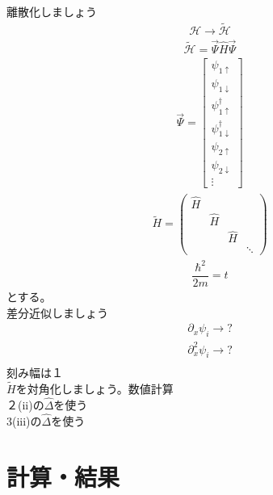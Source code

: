\documentclass{jarticle}
\begin{document}
離散化しましょう\\
\begin{align}
\mathcal{H}\rightarrow \tilde{\mathcal{H}}
\end{align}
\begin{align}
\tilde{\mathcal{H}}=\vec{\Psi}\hat{H}\vec{\Psi}		%
\end{align}
\begin{align}
\vec{\Psi}=\begin{bmatrix}
\psi_{1\uparrow} \\
\psi_{1\downarrow} \\
\psi_{1\uparrow}^\dagger \\
\psi_{1\downarrow}^\dagger\\
\psi_{2\uparrow} \\
\psi_{2\downarrow} \\
\vdots
\end{bmatrix}
\end{align}
\begin{align}
\tilde{H}=
\begin{pmatrix}
\hat{H} &  &  &  \\
& \hat{H} &  &  \\
&  & \hat{H} &  \\
&  &  & \ddots
\end{pmatrix}
\end{align}
\begin{align}
\dfrac{\hbar^2}{2m}=t
\end{align}
とする。\\
差分近似しましょう\\
\begin{align}
\partial_x \psi_i\rightarrow?\\
\partial^2_x \psi_i\rightarrow?\\
\end{align}
刻み幅は$１$\\
$\tilde{H}$を対角化しましょう。数値計算\\
２(ii)の$\hat{\Delta}$を使う\\
3(iii)の$\hat{\Delta}$を使う\\
\section{計算・結果}
\end{document}
